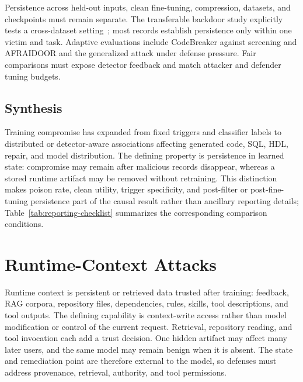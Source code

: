\documentclass[acmsmall,screen,review]{acmart}
\begin{document}
Persistence across held-out inputs, clean fine-tuning, compression, datasets, and checkpoints must remain separate. The transferable backdoor study explicitly tests a cross-dataset setting~\cite{transferable2026backdoor}; most records establish persistence only within one victim and task. Adaptive evaluations include CodeBreaker against screening and AFRAIDOOR and the generalized attack under defense pressure. Fair comparisons must expose detector feedback and match attacker and defender tuning budgets.

\subsection{Synthesis} \label{sec:poison:discussion}
Training compromise has expanded from fixed triggers and classifier labels to distributed or detector-aware associations affecting generated code, SQL, HDL, repair, and model distribution. The defining property is persistence in learned state: compromise may remain after malicious records disappear, whereas a stored runtime artifact may be removed without retraining. This distinction makes poison rate, clean utility, trigger specificity, and post-filter or post-fine-tuning persistence part of the causal result rather than ancillary reporting details; Table~\ref{tab:reporting-checklist} summarizes the corresponding comparison conditions.

\section{Runtime-Context Attacks} \label{sec:runtime}

Runtime context is persistent or retrieved data trusted after training: feedback, RAG corpora, repository files, dependencies, rules, skills, tool descriptions, and tool outputs. The defining capability is context-write access rather than model modification or control of the current request. Retrieval, repository reading, and tool invocation each add a trust decision. One hidden artifact may affect many later users, and the same model may remain benign when it is absent. The state and remediation point are therefore external to the model, so defenses must address provenance, retrieval, authority, and tool permissions.
\end{document}
